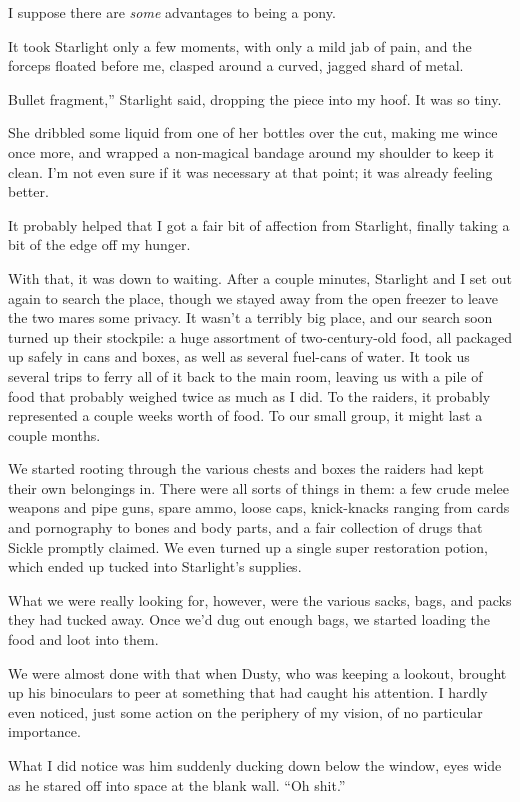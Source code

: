 I suppose there are \textit{some} advantages to being a pony.

It took Starlight only a few moments, with only a mild jab of pain, and the forceps floated before me, clasped around a curved, jagged shard of metal.

\leavevmode{}Bullet fragment,” Starlight said, dropping the piece into my hoof. It was so tiny.

She dribbled some liquid from one of her bottles over the cut, making me wince once more, and wrapped a non-magical bandage around my shoulder to keep it clean. I’m not even sure if it was necessary at that point; it was already feeling better.

It probably helped that I got a fair bit of affection from Starlight, finally taking a bit of the edge off my hunger.

With that, it was down to waiting. After a couple minutes, Starlight and I set out again to search the place, though we stayed away from the open freezer to leave the two mares some privacy. It wasn’t a terribly big place, and our search soon turned up their stockpile: a huge assortment of two-century-old food, all packaged up safely in cans and boxes, as well as several fuel-cans of water. It took us several trips to ferry all of it back to the main room, leaving us with a pile of food that probably weighed twice as much as I did. To the raiders, it probably represented a couple weeks worth of food. To our small group, it might last a couple months.

We started rooting through the various chests and boxes the raiders had kept their own belongings in. There were all sorts of things in them: a few crude melee weapons and pipe guns, spare ammo, loose caps, knick-knacks ranging from cards and pornography to bones and body parts, and a fair collection of drugs that Sickle promptly claimed. We even turned up a single super restoration potion, which ended up tucked into Starlight’s supplies.

What we were really looking for, however, were the various sacks, bags, and packs they had tucked away. Once we’d dug out enough bags, we started loading the food and loot into them.

We were almost done with that when Dusty, who was keeping a lookout, brought up his binoculars to peer at something that had caught his attention. I hardly even noticed, just some action on the periphery of my vision, of no particular importance.

What I did notice was him suddenly ducking down below the window, eyes wide as he stared off into space at the blank wall. “Oh shit.”

